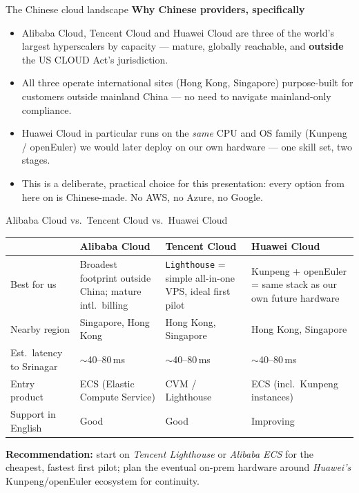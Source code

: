 \documentclass[aspectratio=169,10pt]{beamer}
\newcommand{\eyebrow}[1]{{\small\color{sovGold}\textbf{#1}}}
\begin{document}
\begin{frame}{The Chinese cloud landscape}
  \eyebrow{Why Chinese providers, specifically}
  \begin{itemize}
    \item Alibaba Cloud, Tencent Cloud and Huawei Cloud are three of the world's largest hyperscalers by capacity --- mature, globally reachable, and \textbf{outside} the US CLOUD Act's jurisdiction.
    \item All three operate international sites (Hong Kong, Singapore) purpose-built for customers outside mainland China --- no need to navigate mainland-only compliance.
    \item Huawei Cloud in particular runs on the \emph{same} CPU and OS family (Kunpeng / openEuler) we would later deploy on our own hardware --- one skill set, two stages.
    \item This is a deliberate, practical choice for this presentation: every option from here on is Chinese-made. No AWS, no Azure, no Google.
  \end{itemize}
\end{frame}

\begin{frame}{Alibaba Cloud vs.\ Tencent Cloud vs.\ Huawei Cloud}
  \small
  \renewcommand{\arraystretch}{1.25}
  \begin{tabularx}{\linewidth}{@{}l>{\raggedright\arraybackslash}X>{\raggedright\arraybackslash}X>{\raggedright\arraybackslash}X@{}}
    \toprule
     & \textbf{Alibaba Cloud} & \textbf{Tencent Cloud} & \textbf{Huawei Cloud} \\
    \midrule
    Best for us & Broadest footprint outside China; mature intl.\ billing & \texttt{Lighthouse} = simple all-in-one VPS, ideal first pilot & Kunpeng + openEuler = same stack as our own future hardware \\
    Nearby region & Singapore, Hong Kong & Hong Kong, Singapore & Hong Kong, Singapore \\
    Est.\ latency to Srinagar & $\sim$40--80\,ms & $\sim$40--80\,ms & $\sim$40--80\,ms \\
    Entry product & ECS (Elastic Compute Service) & CVM / Lighthouse & ECS (incl.\ Kunpeng instances) \\
    Support in English & Good & Good & Improving \\
    \bottomrule
  \end{tabularx}
  \vspace{10pt}
  \begin{takeaway}
   \textbf{Recommendation:} start on \emph{Tencent Lighthouse} or \emph{Alibaba ECS} for the cheapest, fastest first pilot; plan the eventual on-prem hardware around \emph{Huawei's} Kunpeng/openEuler ecosystem for continuity.
  \end{takeaway}
\end{frame}
\end{document}
